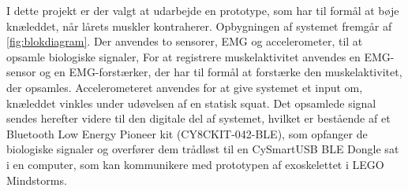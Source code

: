 I dette projekt er der valgt at udarbejde en prototype, som har til formål at bøje knæleddet, når lårets muskler kontraherer. Opbygningen af systemet fremgår af \autoref{fig:blokdiagram}. Der anvendes to sensorer, EMG og accelerometer, til at opsamle biologiske signaler, For at registrere muskelaktivitet anvendes en EMG-sensor og en EMG-forstærker, der har til formål at forstærke den muskelaktivitet, der opsamles. Accelerometeret anvendes for at give systemet et input om, knæleddet vinkles  under udøvelsen af en statisk squat. Det opsamlede signal sendes herefter videre til den digitale del af systemet, hvilket er bestående af et Bluetooth Low Energy Pioneer kit (CY8CKIT-042-BLE), som opfanger de biologiske signaler og overfører dem trådløst til en CySmartUSB BLE Dongle sat i en computer, som kan kommunikere med prototypen af exoskelettet i LEGO Mindstorms. 


